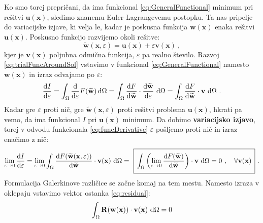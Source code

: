 Ko smo torej prepričani, da ima funkcional \eqref{eq:GeneralFunctional} minimum pri rešitvi $\mathbf{u}(\mathbf{x})$, sledimo znanemu Euler-Lagrangevemu postopku. Ta nas pripelje do variacijske izjave, ki velja le, kadar je poskusna funkcija $\mathbf{w}(\mathbf{x})$ enaka rešitvi $\mathbf{u}(\mathbf{x})$. Poskusno funkcijo razvijemo okoli rešitve:
\begin{equation}
	\widetilde{\mathbf{w}}(\mathbf{x}, \varepsilon) = \mathbf{u}(\mathbf{x}) + \varepsilon \mathbf{v}(\mathbf{x}) \ ,
	\label{eq:trialFuncAroundSol}
\end{equation}
kjer je $\mathbf{v}(\mathbf{x})$ poljubna odmična funkcija, $\varepsilon$ pa realno število. Razvoj \eqref{eq:trialFuncAroundSol} vstavimo v funkcional \eqref{eq:GeneralFunctional} namesto $\mathbf{w}(\mathbf{x})$ in izraz odvajamo po $\varepsilon$:
\begin{equation}
\frac{\mathrm{d} I}{\mathrm{d} \varepsilon} = \int_{\Omega} \frac{\mathrm{d}}{\mathrm{d} \varepsilon} F(\widetilde{\mathbf{w}}) \, \mathrm{d} \Omega = \int_{\Omega} \frac{\mathrm{d} F}{\mathrm{d} \widetilde{\mathbf{w}}} \cdot \frac{\mathrm{d} \widetilde{\mathbf{w}}}{\mathrm{d} \varepsilon} \ \mathrm{d} \Omega = \int_{\Omega} \frac{\mathrm{d} F}{\mathrm{d} \widetilde{\mathbf{w}}} \cdot \mathbf{v} \ \mathrm{d} \Omega \ .
\label{eq:funcDerivative}
\end{equation}
Kadar gre $\varepsilon$ proti nič, gre $\widetilde{\mathbf{w}}(\mathbf{x}, \varepsilon)$ proti rešitvi problema $\mathbf{u}(\mathbf{x})$, hkrati pa vemo, da ima funkcional $I$ pri $\mathbf{u}(\mathbf{x})$ minimum. Da dobimo \textbf{variacijsko izjavo}, torej v odvodu funkcionala \eqref{eq:funcDerivative} $\varepsilon$ pošljemo proti nič in izraz enačimo z nič:
\begin{equation}
	\lim_{\varepsilon \rightarrow 0} \frac{\ud I}{\ud \varepsilon} = \lim_{\varepsilon \rightarrow 0} \int_{\Omega} \frac{\ud F(\widetilde{\mathbf{w}}(\mathbf{x}, \varepsilon))}{\ud \widetilde{\mathbf{w}}} \cdot \mathbf{v(\mathbf{x})} \ \ud \Omega = \ \boxed{\, \int_{\Omega} \left( \lim_{\varepsilon \rightarrow 0} \frac{\ud F(\widetilde{\mathbf{w}})}{\ud \widetilde{\mathbf{w}}} \right) \cdot \mathbf{v} \ \ud \Omega = 0 \ , \quad \forall \mathbf{v(\mathbf{x})}\, \vphantom{\Biggr{)}}} \ .
	\label{eq:variationalStatement}
\end{equation}
Formulacija Galerkinove različice se začne komaj na tem mestu. Namesto izraza v oklepaju vstavimo vektor ostanka \eqref{eq:residual}:
\begin{equation}
	\int_{\Omega} \mathbf{R(w(x))} \cdot \mathbf{v(x)} \ \mathrm{d} \Omega = 0
\end{equation}

